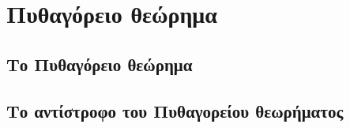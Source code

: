 \chapter{Πυθαγόρειο θεώρημα}
\section{Το Πυθαγόρειο θεώρημα}
\section{Το αντίστροφο του Πυθαγορείου θεωρήματος}
